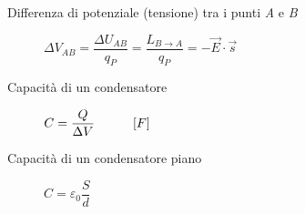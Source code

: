 \documentclass[a4paper,11pt,italian]{article}
\begin{document}
\begin{description}
  
  \item[Differenza di potenziale (tensione) tra i punti \textit{A} e \textit{B}]
  $  \Delta V_{AB} = \dfrac{\Delta U_{AB}}{q_P} = \dfrac{L_{B \rightarrow A}}{q_P} = - \vec{E} \cdot \vec{s} $
  
%   
%   
%   
  
  
  \item[Capacità di un condensatore]
  $ C = \dfrac{Q}{\Delta V} \hspace*{3em} [F] $
  
  \item[Capacità di un condensatore piano]
  $ C = \varepsilon_0 \dfrac{S}{d} $
  

\end{description}
\end{document}
